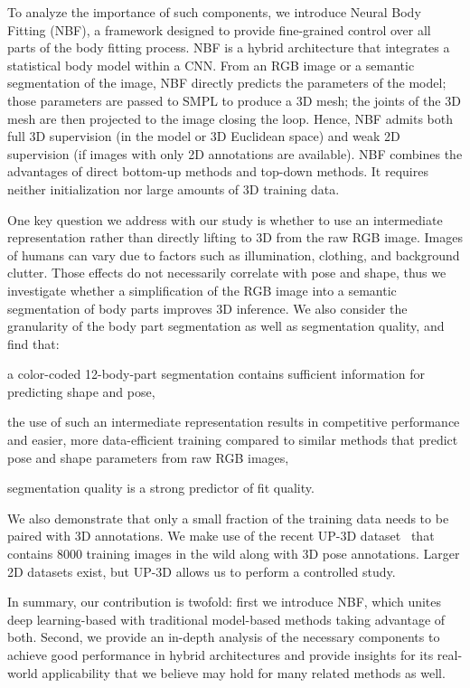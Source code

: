 \documentclass[10pt,twocolumn,letterpaper]{article}
\begin{document}
To analyze the importance of such components, we introduce Neural Body Fitting
(NBF), a framework designed to provide fine-grained control over all
parts of the body fitting process. NBF is a hybrid architecture that
integrates a statistical body model within a CNN. From an RGB image
or a semantic segmentation of the image, NBF directly predicts the parameters of
the model; those parameters are passed to SMPL to produce a 3D mesh; the joints
of the 3D mesh are then projected to the image closing the loop. Hence, NBF
admits both full 3D supervision (in the model or 3D Euclidean space) and weak 2D
supervision (if images with only 2D annotations are available). NBF combines the advantages 
of direct bottom-up methods and top-down methods. It requires neither 
initialization nor large amounts of 3D training data.

One key question we address with our study is whether to use an intermediate 
representation rather than directly lifting to 3D from the raw RGB image.
Images of humans can vary due to factors such as illumination, clothing,
and background clutter. Those effects do not necessarily correlate with pose and shape, 
thus we investigate whether a simplification of the RGB image into a
semantic segmentation of body parts improves 3D inference. We also consider
the granularity of the body part segmentation as well as segmentation quality,
and find that: \begin{inparaenum}[(i)]
       \item a color-coded 12-body-part segmentation contains sufficient information for predicting shape and pose,
       \item the use of such an intermediate representation results in competitive performance and easier, more 
       data-efficient training compared to similar methods that predict pose and shape parameters from raw RGB images,
       \item segmentation quality is a strong predictor of fit quality.
     \end{inparaenum}

We also demonstrate that only a small fraction of the training data needs to be paired with 3D annotations. 
We make use of the recent UP-3D dataset~\cite{Lassner:UP:2017} that contains 8000 training images in the wild 
along with 3D pose annotations. Larger 2D datasets exist, but UP-3D allows us to perform a controlled study.

In summary, our contribution is twofold: first we introduce NBF, which unites
deep learning-based with traditional model-based methods taking advantage of
both. Second, we provide an in-depth analysis of the necessary components to
achieve good performance in hybrid architectures and provide insights for its
real-world applicability that we believe may hold for many related methods as
well.
\end{document}
